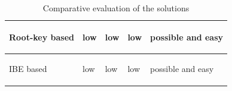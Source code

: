 \documentclass[runningheads,a4paper]{llncs} %
\begin{document}
\begin{table}
\begin{center}
\begin{tabular}{ |p{3.5cm}|p{2cm}|p{2cm}|p{2cm}|p{2cm}|  }
\begin{center} Root-key based  \end{center}  & \begin{center} low \end{center} & \begin{center} low \end{center} & \begin{center} low \end{center} & \begin{center} possible and easy \end{center} \\ \hline
\begin{center} IBE based \end{center} & \begin{center} low \end{center} & \begin{center} low \end{center} & \begin{center} low \end{center} & \begin{center} possible and easy \end{center} \\
\hline
\end{tabular}
\vspace{5pt}
\caption{Comparative evaluation of the solutions}
\label{table:comparison}
\end{center}
\end{table}


\end{document}
